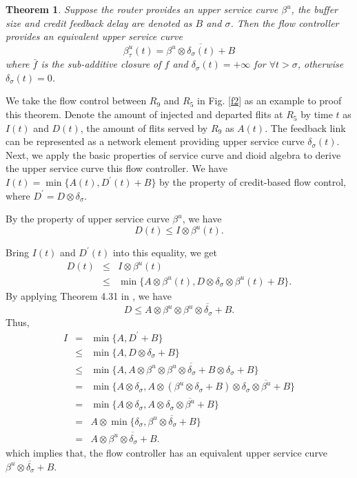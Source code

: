 \documentclass[10pt,journal]{IEEEtran}
\newtheorem{theorem}{Theorem}
\begin{document}
\begin{theorem}\label{credit}
Suppose the router provides an upper service curve $\beta^u$, the buffer size and credit feedback delay are denoted as $B$ and $\sigma$. Then the flow controller provides an equivalent upper service curve $$\beta^{u}_\tau(t)=\overline{\beta^u\otimes\delta_\sigma(t)+B}$$ where $\bar{f}$ is the sub-additive closure of $f$ \cite{Boudec2001Network} and $\delta_\sigma(t)=+\infty$ for $\forall t>\sigma$, otherwise $\delta_\sigma(t)=0$.
\end{theorem}
\begin{IEEEproof}
We take the flow control between $R_9$ and $R_5$ in Fig. \ref{f2} as an example to proof this theorem. Denote the amount of injected and departed flits at $R_5$ by time $t$ as $I(t)$ and $D(t)$, the amount of flits served by $R_9$ as $A(t)$. The feedback link can be represented as a network element providing upper service curve $\delta_\sigma(t)$. Next, we apply the basic properties of service curve and dioid algebra to derive the upper service curve this flow controller. We have $I(t)=\min\{A(t),D^\prime(t)+B\}$ by the property of credit-based flow control, where $D^\prime=D\otimes\delta_\sigma$.
 
By the property of upper service curve $\beta^u$, we have
$$D(t)\leq I\otimes \beta^u(t).$$ 

Bring $I(t)$ and $D^\prime(t)$ into this equality, we get
\begin{eqnarray*}
D(t)&\leq& I\otimes \beta^u(t)\\
&\leq& \min\{A\otimes \beta^u(t),D\otimes\delta_\sigma\otimes \beta^u(t)+B\}.
\end{eqnarray*}
By applying Theorem 4.31 in \cite{Boudec2001Network}, we have
$$D\leq A\otimes \beta^u\otimes\overline{\beta^u\otimes\delta_\sigma+B}.$$
Thus,
\begin{eqnarray*}
  I&=& \min\{A,D^\prime+B\}\\
  &\leq& \min\{A,D\otimes\delta_\sigma+B\}\\
  &\leq& \min\{A,A\otimes \beta^u\otimes\overline{\beta^u\otimes\delta_\sigma+B}\otimes\delta_\sigma+B\}\\
  &=& \min\{A\otimes \delta_\sigma,A\otimes (\beta^u\otimes\delta_\sigma+B)\otimes\overline{\delta_\sigma\otimes\beta^u+B}\}\\
  &=& \min\{A\otimes \delta_\sigma,A\otimes \overline{\delta_\sigma\otimes\beta^u+B}\}\\
  &=& A\otimes\min\{\delta_\sigma,\overline{\beta^u\otimes\delta_\sigma+B}\}\\
  &=& A\otimes\overline{\beta^u\otimes\delta_\sigma+B}.
\end{eqnarray*}
which implies that, the flow controller has an equivalent upper service curve $\overline{\beta^u\otimes\delta_\sigma+B}$.
\end{IEEEproof}
\end{document}
